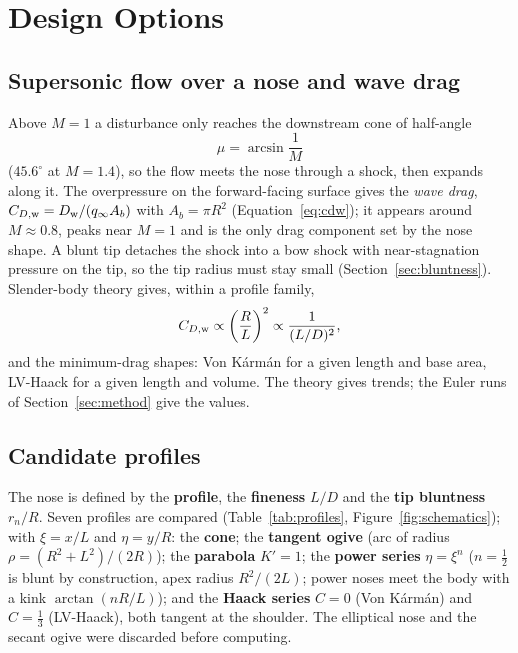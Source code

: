 \section{Design Options}
\label{sec:options}

\subsection{Supersonic flow over a nose and wave drag}
\label{sec:physics}

Above $M = 1$ a disturbance only reaches the downstream cone of half-angle
\begin{equation}
\mu = \arcsin\frac{1}{M}
\label{eq:mach}
\end{equation}
($45.6^\circ$ at $M = 1.4$), so the flow meets the nose through a shock, then expands along it. The
overpressure on the forward-facing surface gives the \emph{wave drag}, $C_{D,\rm w} = D_{\rm w}/(q_\infty
A_b)$ with $A_b = \pi R^2$ (Equation~\eqref{eq:cdw}); it appears around $M \approx 0.8$, peaks near
$M = 1$ and is the only drag component set by the nose shape. A blunt tip detaches the shock into a bow
shock with near-stagnation pressure on the tip, so the tip radius must stay small
(Section~\ref{sec:bluntness}). Slender-body theory gives, within a profile family,
\begin{equation}
C_{D,\rm w} \propto \left(\frac{R}{L}\right)^2 \propto \frac{1}{(L/D)^2} ,
\label{eq:fineness}
\end{equation}
and the minimum-drag shapes: Von K\'arm\'an for a given length and base area, LV-Haack for a given length
and volume. The theory gives trends; the Euler runs of Section~\ref{sec:method} give the values.

\subsection{Candidate profiles}
\label{sec:profiles}

The nose is defined by the \textbf{profile}, the \textbf{fineness} $L/D$ and the \textbf{tip bluntness}
$r_n/R$. Seven profiles are compared (Table~\ref{tab:profiles}, Figure~\ref{fig:schematics}); with
$\xi = x/L$ and $\eta = y/R$: the \textbf{cone}; the \textbf{tangent ogive} (arc of radius
$\rho = (R^2+L^2)/(2R)$); the \textbf{parabola} $K' = 1$; the \textbf{power series} $\eta = \xi^n$
($n = \tfrac12$ is blunt by construction, apex radius $R^2/(2L)$; power noses meet the body with a kink
$\arctan(nR/L)$); and the \textbf{Haack series} $C = 0$ (Von K\'arm\'an) and $C = \tfrac13$ (LV-Haack),
both tangent at the shoulder. The elliptical nose and the secant ogive were discarded before computing.

